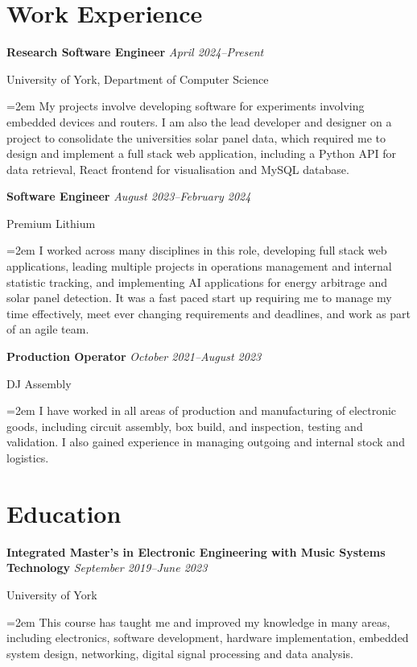 \documentclass[12pt]{article} %
\newcommand{\education}[4]{
\noindent  \textbf{#1}
  \newline
  \noindent \textit{#2} \par
  \noindent #3 \par
\vspace*{0.5em}
  \noindent\hangindent=2em\hangafter=0 \small #4
\normalsize \par}
\newcommand{\work}[4]{
  \noindent  \textbf{#1}
  \newline
  \noindent \textit{#2} \par
  \noindent #3 \par
\vspace*{0.5em}
  \noindent\hangindent=2em\hangafter=0 \small #4 
\normalsize \par}
\begin{document}
\section*{Work Experience}
\work{Research Software Engineer}{April 2024--Present}{University of York, Department of Computer Science}{My projects involve developing software for experiments involving embedded devices and routers. I am also the lead developer and designer on a project to consolidate the universities solar panel data, which required me to design and implement a full stack web application, including a Python API for data retrieval, React frontend for visualisation and MySQL database.}
\work{Software Engineer}{August 2023--February 2024}{Premium Lithium}{I worked across many disciplines in this role, developing full stack web applications, leading multiple projects in operations management and internal statistic tracking, and implementing AI applications for energy arbitrage and solar panel detection. It was a fast paced start up requiring me to manage my time effectively, meet ever changing requirements and deadlines, and work as part of an agile team.}
\work{Production Operator}{October 2021--August 2023}{DJ Assembly}{I have worked in all areas of production and manufacturing of electronic goods, including circuit assembly, box build, and inspection, testing and validation. I also gained experience in managing outgoing and internal stock and logistics.}

\section*{Education}

\education{Integrated Master's in Electronic Engineering with Music Systems Technology}{September 2019--June 2023}{University of York}{This course has taught me and improved my knowledge in many areas, including electronics, software development, hardware implementation, embedded system design, networking, digital signal processing and data analysis. \\}


\end{document}
